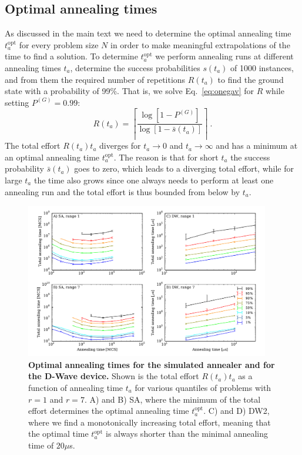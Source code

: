 \subsection{Optimal annealing times}
\label{sec:scaling-optimality}
As discussed in the main text we need to determine the optimal annealing time $t_a^{\textrm{opt}}$ for every problem size $N$ in order to make meaningful extrapolations of the time to find a solution. To determine $t_a^{\textrm{opt}}$ we perform annealing runs at different annealing times $t_a$, determine the success probabilities $s(t_a)$ of 1000 instances, and from them the required number of repetitions $R(t_a)$ to find the ground state with a probability of 99\%. That is, we solve Eq.~\eqref{eq:onegav} for $R$ while setting $P^{(G)} = 0.99$:
%
\begin{equation}
R(t_a) = \left\lceil\frac{\log[1-P^{(G)}]}{\log[1-\bar{s}(t_a)]}\right\rceil\ .
\label{eq:R}
\end{equation}
%
The total effort $R(t_a)t_a$ diverges for $t_a\rightarrow 0$ and $t_a\rightarrow\infty$ and has a minimum at an optimal annealing time $t_a^{\textrm{opt}}$. The reason is that for short $t_a$ the success probability $\bar{s}(t_a)$ goes to zero, which leads to a diverging total effort, while for large $t_a$ the time also grows since one always needs to perform at least one annealing run and the total effort is thus bounded from below by $t_a$.

\begin{figure}[t]
\includegraphics[width=0.95\textwidth]{fig10.pdf}
\caption{{\bf Optimal annealing times for the simulated annealer and for the D-Wave device.} Shown is the total effort $R(t_a)t_a$ as a function of annealing time $t_a$ for various quantiles of problems with $r=1$ and $r=7$. A) and B) SA, where the minimum of the total effort determines the optimal annealing time $t_a^{\textrm{opt}}$.  C) and D) DW2, where we find a monotonically increasing total effort, meaning that the optimal time $t_a^{\textrm{opt}}$ is always shorter than the minimal annealing time of $20\mu$s.}
\label{fig:satopt}
\end{figure}
%



